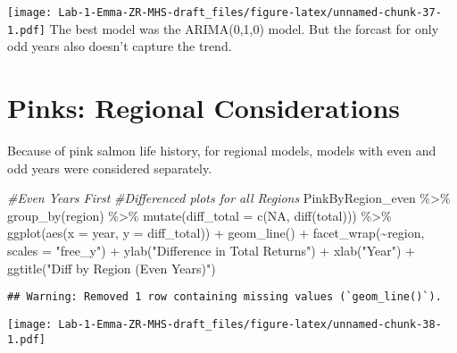 \documentclass[
]{article}
\newenvironment{Shaded}{\begin{snugshade}}{\end{snugshade}}
\newcommand{\AttributeTok}[1]{\textcolor[rgb]{0.77,0.63,0.00}{#1}}
\newcommand{\CommentTok}[1]{\textcolor[rgb]{0.56,0.35,0.01}{\textit{#1}}}
\newcommand{\ConstantTok}[1]{\textcolor[rgb]{0.00,0.00,0.00}{#1}}
\newcommand{\FunctionTok}[1]{\textcolor[rgb]{0.00,0.00,0.00}{#1}}
\newcommand{\NormalTok}[1]{#1}
\newcommand{\SpecialCharTok}[1]{\textcolor[rgb]{0.00,0.00,0.00}{#1}}
\newcommand{\StringTok}[1]{\textcolor[rgb]{0.31,0.60,0.02}{#1}}
\begin{document}
\texttt{[image: Lab-1-Emma-ZR-MHS-draft\_files/figure-latex/unnamed-chunk-37-1.pdf]}
The best model was the ARIMA(0,1,0) model. But the forcast for only odd
years also doesn't capture the trend.

\hypertarget{pinks-regional-considerations}{%
\section{Pinks: Regional
Considerations}\label{pinks-regional-considerations}}

Because of pink salmon life history, for regional models, models with
even and odd years were considered separately.

\begin{Shaded}
\begin{Highlighting}[]
\CommentTok{\#Even Years First }
\CommentTok{\#Differenced plots for all Regions }
\NormalTok{PinkByRegion\_even }\SpecialCharTok{\%\textgreater{}\%}
  \FunctionTok{group\_by}\NormalTok{(region) }\SpecialCharTok{\%\textgreater{}\%}
  \FunctionTok{mutate}\NormalTok{(}\AttributeTok{diff\_total =} \FunctionTok{c}\NormalTok{(}\ConstantTok{NA}\NormalTok{, }\FunctionTok{diff}\NormalTok{(total))) }\SpecialCharTok{\%\textgreater{}\%}
  \FunctionTok{ggplot}\NormalTok{(}\FunctionTok{aes}\NormalTok{(}\AttributeTok{x =}\NormalTok{ year, }\AttributeTok{y =}\NormalTok{ diff\_total)) }\SpecialCharTok{+}
  \FunctionTok{geom\_line}\NormalTok{() }\SpecialCharTok{+}
  \FunctionTok{facet\_wrap}\NormalTok{(}\SpecialCharTok{\textasciitilde{}}\NormalTok{region, }\AttributeTok{scales =} \StringTok{"free\_y"}\NormalTok{) }\SpecialCharTok{+}
  \FunctionTok{ylab}\NormalTok{(}\StringTok{"Difference in Total Returns"}\NormalTok{) }\SpecialCharTok{+}
  \FunctionTok{xlab}\NormalTok{(}\StringTok{"Year"}\NormalTok{) }\SpecialCharTok{+}
  \FunctionTok{ggtitle}\NormalTok{(}\StringTok{"Diff by Region (Even Years)"}\NormalTok{) }
\end{Highlighting}
\end{Shaded}

\begin{verbatim}
## Warning: Removed 1 row containing missing values (`geom_line()`).
\end{verbatim}

\texttt{[image: Lab-1-Emma-ZR-MHS-draft\_files/figure-latex/unnamed-chunk-38-1.pdf]}
\end{document}
